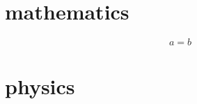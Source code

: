 \documentclass[11pt,a4j,report]{jsarticle}
\begin{document}
\section{mathematics}

\begin{equation}
a = b
\end{equation}

\section{physics}
\end{document}
